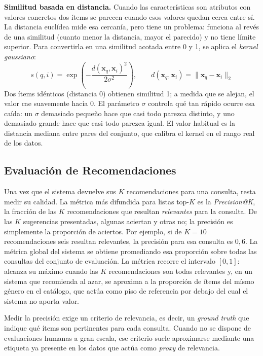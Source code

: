 \textbf{Similitud basada en distancia.} Cuando las características son atributos con valores concretos dos ítems se parecen cuando esos valores quedan cerca entre sí. La distancia euclídea mide esa cercanía, pero tiene un problema: funciona al revés de una similitud (cuanto menor la distancia, mayor el parecido) y no tiene límite superior. Para convertirla en una similitud acotada entre 0 y 1, se aplica el \textit{kernel gaussiano}:
\begin{equation}
    s(q, i) = \exp\!\left( -\frac{d(\mathbf{x}_q, \mathbf{x}_i)^2}{2\sigma^2} \right), \qquad d(\mathbf{x}_q, \mathbf{x}_i) = \|\mathbf{x}_q - \mathbf{x}_i\|_2
    \label{eq:gaussian-kernel}
\end{equation}
\noindent Dos ítems idénticos (distancia 0) obtienen similitud 1; a medida que se alejan, el valor cae suavemente hacia 0. El parámetro $\sigma$ controla qué tan rápido ocurre esa caída: un $\sigma$ demasiado pequeño hace que casi todo parezca distinto, y uno demasiado grande hace que casi todo parezca igual. El valor habitual es la distancia mediana entre pares del conjunto, que calibra el kernel en el rango real de los datos.

\subsection{Evaluación de Recomendaciones}
\label{subsec:evaluacion-recomendaciones}

Una vez que el sistema devuelve sus $K$ recomendaciones para una consulta, resta medir su calidad. La métrica más difundida para listas top-$K$ es la \textit{Precision@K}, la fracción de las $K$ recomendaciones que resultan \textit{relevantes} para la consulta. De las $K$ sugerencias presentadas, algunas aciertan y otras no; la precisión es simplemente la proporción de aciertos. Por ejemplo, si de $K=10$ recomendaciones seis resultan relevantes, la precisión para esa consulta es $0{,}6$. La métrica global del sistema se obtiene promediando esa proporción sobre todas las consultas del conjunto de evaluación. La métrica recorre el intervalo $[0, 1]$: alcanza su máximo cuando las $K$ recomendaciones son todas relevantes y, en un sistema que recomienda al azar, se aproxima a la proporción de ítems del mísmo género en el catálogo, que actúa como piso de referencia por debajo del cual el sistema no aporta valor.

Medir la precisión exige un criterio de relevancia, es decir, un \textit{ground truth} que indique qué ítems son pertinentes para cada consulta. Cuando no se dispone de evaluaciones humanas a gran escala, ese criterio suele aproximarse mediante una etiqueta ya presente en los datos que actúa como \textit{proxy} de relevancia.

